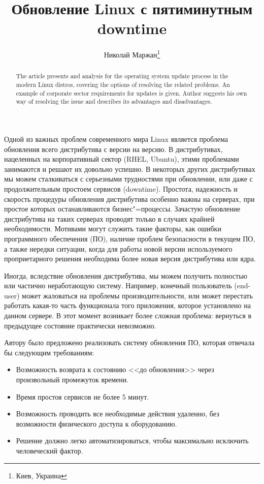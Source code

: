 \documentclass[10pt, a5paper]{article}
\begin{document}
\title{Обновление Linux с пятиминутным downtime}%

\author{Николай Маржан\footnote{Киев, Украина}}
\maketitle

\begin{abstract}
The article presents and analysis for the operating system update process in the modern Linux distros, covering the options of resolving the related problems. An example of corporate sector requirements for updates is given. Author suggests his own way of resolving the issue and describes its advantages and disadvantages.
\end{abstract}


Одной из важных проблем современного мира Linux является проблема обновления всего дистрибутива с версии на версию. В дистрибутивах, нацеленных на корпоративный сектор (RHEL, Ubuntu), этими проблемами занимаются и решают их довольно успешно. В некоторых других дистрибутивах мы можем сталкиваться с серьезными трудностями при обновлении, или даже с продолжительным простоем сервисов (downtime). Простота, надежность и скорость процедуры обновления дистрибутива особенно \linebreak важны на серверах, при простое которых останавливаются бизнес"=процессы. Зачастую обновление дистрибутива на таких серверах проводят только в случаях крайней необходимости. Мотивами могут служить такие факторы, как ошибки программного обеспечения (ПО), наличие проблем безопасности в текущем ПО, а также нередки ситуации, когда для работы новой версии используемого проприетарного решения необходима более новая версия дистрибутива или ядра.

Иногда, вследствие обновления дистрибутива, мы можем получить полностью или частично неработающую систему. Например, конечный пользователь (end-user) может жаловаться на проблемы производительности, или может перестать работать какая-то часть функционала того приложения, которое установлено на данном сервере. В этот момент возникает более сложная проблема: вернуться в предыдущее состояние практически невозможно.

Автору было предложено реализовать систему обновления ПО, которая отвечала бы следующим требованиям:

\begin{itemize}
  \item Возможность возврата к состоянию <<до обновления>> через произвольный промежуток времени.
  \item Время простоя сервисов не более 5 минут.
  \item Возможность проводить все необходимые действия удаленно, без возможности физического доступа к оборудованию.
  \item Решение должно легко автоматизироваться, чтобы максимально исключить человеческий фактор.
\end{itemize}
\end{document}
